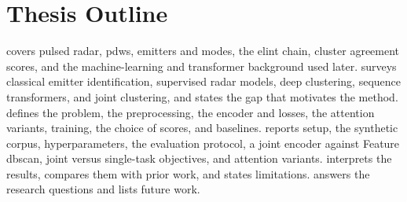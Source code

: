 \section{Thesis Outline}\label{sec:intro:outline}

 covers pulsed radar, \glspl{pdw}, emitters and modes, the \gls{elint} chain, cluster agreement scores, and the machine-learning and transformer background used later.
 surveys classical emitter identification, supervised radar models, deep clustering, sequence transformers, and joint clustering, and states the gap that motivates the method.
 defines the problem, the preprocessing, the encoder and losses, the attention variants, training, the choice of scores, and baselines.
 reports setup, the synthetic corpus, hyperparameters, the evaluation protocol, a joint encoder against Feature \gls{dbscan}, joint versus single-task objectives, and attention variants.
 interprets the results, compares them with prior work, and states limitations.
 answers the research questions and lists future work.
